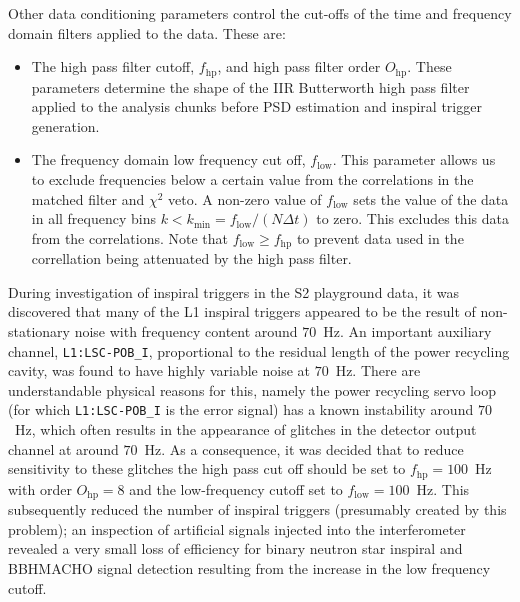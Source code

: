 Other data conditioning parameters control the cut-offs of the time
and frequency domain filters applied to the data. These are:
\begin{itemize}
\item The high pass filter cutoff, $f_\mathrm{hp}$, and high pass filter
order $O_\mathrm{hp}$. These parameters determine the shape of the IIR
Butterworth high pass filter applied to the analysis chunks before PSD
estimation and inspiral trigger generation.

\item The frequency domain low frequency cut off, $f_\mathrm{low}$. This
parameter allows us to exclude frequencies below a certain value from the
correlations in the matched filter and $\chi^2$ veto. A non-zero value of
$f_\mathrm{low}$ sets the value of the data in all frequency bins $k <
k_\mathrm{min} = f_\mathrm{low} / (N \Delta t)$ to zero. This excludes this
data from the correlations. Note that $f_\mathrm{low} \ge f_\mathrm{hp}$ to
prevent data used in the correllation being attenuated by the high pass
filter.
\end{itemize}
During investigation of inspiral triggers in the S2 playground data, it was
discovered that many of the L1 inspiral triggers appeared to be the result of
non-stationary noise with frequency content around $70$~Hz.  An important
auxiliary channel, \texttt{L1:LSC-POB\_I}, proportional to the residual length
of the power recycling cavity, was found to have highly variable noise at
$70$~Hz.  There are understandable physical reasons for this, namely the power
recycling servo loop (for which \texttt{L1:LSC-POB\_I} is the error signal)
has a known instability around $70$~Hz, which often results in the appearance
of glitches in the detector output channel at around $70$~Hz.  As a
consequence, it was decided that to reduce sensitivity to these glitches the
high pass cut off should be set to $f_\mathrm{hp} = 100$~Hz with order
$O_\mathrm{hp} = 8$ and the low-frequency cutoff set to $f_\mathrm{low} =
100$~Hz.  This subsequently reduced the number of inspiral triggers
(presumably created by this problem); an inspection of artificial signals
injected into the interferometer revealed a very small loss of efficiency for
binary neutron star inspiral and BBHMACHO signal detection resulting from the
increase in the low frequency cutoff.

